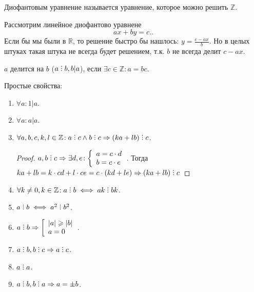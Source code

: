 \begin{definition}
    Диофантовым уравнение называется уравнение, которое можно решить $\mathbb{Z}$.
\end{definition}
Рассмотрим линейное диофантово уравнене \[
 ax+by=c.
.\] 
Если бы мы были в $\mathbb{R}$, то решение быстро бы нашлось: $y = \frac{c - ax}{b}$. Но в целых штуках такая штука не всегда будет решением, т.к. $b$ не всегда делит $c - ax$.
 \begin{definition}
     $a$ делится на $b$ ($a \divby b, b \vert a$), если $\exists c \in \mathbb{Z}: a = bc$.
\end{definition}
Простые свойства:
\begin{enumerate}
    \item             
            $\forall a\!: 1 \vert a$.
    \item
            $\forall a\!: a \vert a$.
    \item
        $\forall a, b, c, k, l \in \Z\!: a \divby c \land b \divby c \Rightarrow (ka + lb) \divby c$.
            \begin{proof}
                $a, b \divby c \Rightarrow \exists d, e\!: \left\{\begin{array}{l} a = c \cdot d \\ b = c \cdot e \end{array}\right.$. Тогда  $ka + lb = k \cdot cd + l \cdot ce = c \cdot (kd + le) \Rightarrow (ka + lb) \divby c$
            \end{proof}
    \item
            $\forall k \neq 0, k \in \mathbb{Z}\!: a \divby b \iff ak \divby bk$.
    \item
            $a \divby b \iff a^2 \divby b^2$.
    \item
            $a \divby b \Rightarrow \left[ \begin{array}{l} |a| \ge |b| \\ a = 0 \end{array} \right.$.
    \item
            $a \divby b, b \divby c \Rightarrow a \divby c$.
    \item 
            $a \divby a$.
    \item 
            $a \divby b, b \divby a \Rightarrow a = \pm b$.
\end{enumerate}

